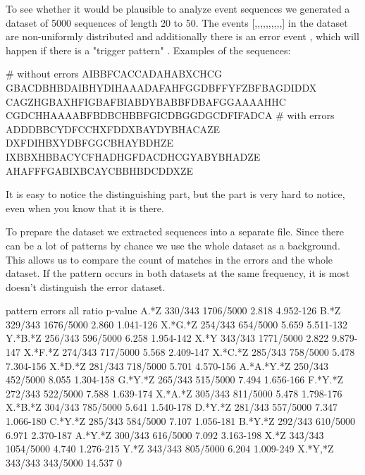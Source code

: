 To see whether it would be plausible to analyze event sequences we generated a dataset of 5000 sequences of length 20 to 50. The events [,,,,,,,,,,] in the dataset are non-uniformly distributed and additionally there is an error event , which will happen if there is a "trigger pattern" . Examples of the sequences:

\begin{file}
# without errors
AIBBFCACCADAHABXCHCG
GBACDBHBDAIBHYDIHAAADAFAHFGGDBFFYFZBFBAGDIDDX
CAGZHGBAXHFIGBAFBIABDYBABBFDBAFGGAAAAHHC
CGDCHHAAAABFBDBCHBBFGICDBGGDGCDFIFADCA
# with errors
ADDDBBCYDFCCHXFDDXBAYDYBHACAZE
DXFDIHBXYDBFGGCBHAYBDHZE
IXBBXHBBACYCFHADHGFDACDHCGYABYBHADZE
AHAFFFGABIXBCAYCBBHBDCDDXZE
\end{file}

It is easy to notice the distinguishing  part, but the  part is very hard to notice, even when you know that it is there.

To prepare the dataset we extracted sequences into a separate file. Since there can be a lot of patterns by chance we use the whole dataset as a background. This allows us to compare the count of matches in the errors and the whole dataset. If the pattern occurs in both datasets at the same frequency, it is most doesn't distinguish the error dataset.

\begin{file}
pattern      errors      all            ratio      p-value
A.*Z         330/343     1706/5000      2.818      4.952-126
B.*Z         329/343     1676/5000      2.860      1.041-126
X.*G.*Z      254/343     654/5000       5.659      5.511-132
Y.*B.*Z      256/343     596/5000       6.258      1.954-142
X.*Y         343/343     1771/5000      2.822      9.879-147
X.*F.*Z      274/343     717/5000       5.568      2.409-147
X.*C.*Z      285/343     758/5000       5.478      7.304-156
X.*D.*Z      281/343     718/5000       5.701      4.570-156
A.*A.*Y.*Z   250/343     452/5000       8.055      1.304-158
G.*Y.*Z      265/343     515/5000       7.494      1.656-166
F.*Y.*Z      272/343     522/5000       7.588      1.639-174
X.*A.*Z      305/343     811/5000       5.478      1.798-176
X.*B.*Z      304/343     785/5000       5.641      1.540-178
D.*Y.*Z      281/343     557/5000       7.347      1.066-180
C.*Y.*Z      285/343     584/5000       7.107      1.056-181
B.*Y.*Z      292/343     610/5000       6.971      2.370-187
A.*Y.*Z      300/343     616/5000       7.092      3.163-198
X.*Z         343/343     1054/5000      4.740      1.276-215
Y.*Z         343/343     805/5000       6.204      1.009-249
X.*Y,*Z      343/343     343/5000       14.537     0
\end{file}

